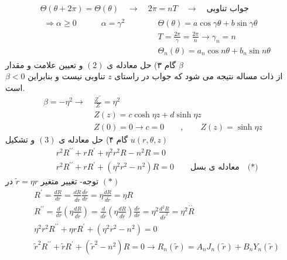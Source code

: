 \begin{equation*}
	\begin{aligned}
		{} &\
		\Theta(\theta+2\pi)=\Theta(\theta)\quad\rightarrow\quad 2\pi=nT\quad\rightarrow\quad \text{جواب تناوبی}
		\\ &\
		\begin{aligned}
			\Rightarrow \alpha \geq 0 \quad \quad \quad  \alpha=\gamma^{2}  \quad \quad \quad
			{} &\
			 \Theta(\theta)=a \cos\gamma\theta+ b \sin\gamma\theta
			 \\ &\
			 T=\frac{2 \pi}{\gamma}=\frac{2 \pi}{n}\rightarrow \gamma_{n}=n
			 \\ &\
			 \Theta_{n}(\theta)=a_{n} \cos n\theta+ b_{n} \sin n\theta
		\end{aligned}
	\end{aligned}
\end{equation*}
گام ۳) حل معادله ی
$(2)$
و تعیین علامت و مقدار
$\beta$\\
از ذات مساله نتیجه می شود که جواب در راستای
$z$
تناوبی نیست و بنابراین
$\beta<0$
است.
\begin{equation*}
	\begin{aligned}
		\beta=-\eta^{2} \rightarrow
		{} &\
		 \frac{Z^{\prime\prime}}{Z}=\eta^{2}
		 \\ &\
		 Z(z)=c \cosh \eta z+ d \sinh \eta z
		 \\ &\
		 Z(0)=0\rightarrow c=0 \quad\quad ,\quad\quad Z(z)=\sinh \eta z
	\end{aligned}
\end{equation*}
گام ۴) حل معادله ی
$(3)$
و تشکیل
$u(r,\theta,z)$
\begin{equation*}
	\begin{aligned}
		{} &\
		r^{2}R^{\prime\prime}+rR^{\prime}+\eta^{2} r^{2} R -n^{2} R=0
		\\ &\
		r^{2}R^{\prime\prime}+rR^{\prime}+(\eta^{2} r^{2}  -n^{2}) R=0 \quad\quad 
		\text{معادله ی بسل}\quad \text{(*)}
	\end{aligned}
\end{equation*}
توجه- تغییر متغیر
$\tilde{r}=\eta r$
در
$(*)$
\begin{equation*}
	\begin{aligned}
		{} &\
		R^{\prime}=\frac{d R}{d r}=\frac{d R}{d \tilde{ r}} \frac{d \tilde{ r}}{d r}=\eta \frac{d R}{d \tilde{ r}}=\eta R
		\\ &\
		R^{\prime \prime}=\frac{d}{d r}\left(\eta \frac{d R}{d \widetilde{r}}\right)=\frac{d}{d \tilde{r}}\left(\eta \frac{d R}{d \tilde{r}}\right) \frac{d \tilde{ r}}{d r}=\eta^{2} \frac{d^{2} R}{d \tilde{r}^{2}}=\eta^{2} \overset {\cdot\cdot}{R}
		\\ &\
		\eta^2r^2R^{\prime\prime}+\eta r R^\prime+\left(\eta^2r^2-n^2\right)=0
		\\ &\
		\tilde{r}^2 R^{\prime\prime}+\tilde{r}R^\prime+\left(\tilde{r}^2-n^2\right)R=0\rightarrow R_n\left(\tilde{r}\right)=A_nJ_n\left(\tilde{r}\right)+B_nY_n\left(\tilde{r}\right)
	\end{aligned}
\end{equation*}
